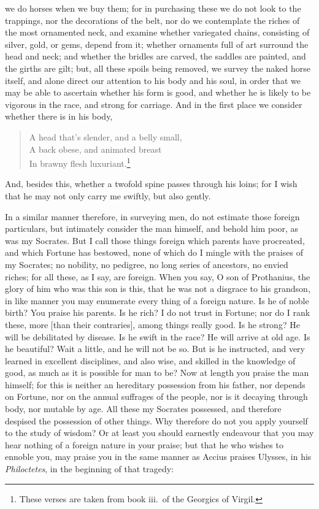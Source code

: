 \documentclass[12pt]{article}
\begin{document}
we do horses when we buy them; for in purchasing these we do not look to the
trappings, nor the decorations of the belt, nor do we contemplate the riches of
the most ornamented neck, and examine whether variegated chains, consisting of
silver, gold, or gems, depend from it; whether ornaments full of art surround
the head and neck; and whether the bridles are carved, the saddles are painted,
and the girths are gilt; but, all these spoils being removed, we survey the
naked horse itself, and alone direct our attention to his body and his soul, in
order that we may be able to ascertain whether his form is good, and whether he
is likely to be vigorous in the race, and strong for carriage. And in the first
place we consider whether there is in his body,

\begin{verse}
A head that's slender, and a belly small,\\
A back obese, and animated breast\\
In brawny flesh luxuriant.\footnote{These verses are taken from book iii.~of
the Georgics of Virgil.}
\end{verse}

\noindent And, besides this, whether a twofold spine passes through his loins;
for I wish that he may not only carry me swiftly, but also gently.

In a similar manner therefore, in surveying men, do not estimate those foreign
particulars, but intimately consider the man himself, and behold him poor, as
was my Socrates. But I call those things foreign which parents have procreated,
and which Fortune has bestowed, none of which do I mingle with the praises of
my Socrates; no nobility, no pedigree, no long series of ancestors, no envied
riches; for all these, as I say, are foreign. When you say, O son of
Prothanius, the glory of him who was this son is this, that he was not a
disgrace to his grandson, in like manner you may enumerate every thing of a
foreign nature. Is he of noble birth? You praise his parents. Is he rich? I do
not trust in Fortune; nor do I rank these, more [than their contraries], among
things really good. Is he strong? He will be debilitated by disease. Is he
swift in the race? He will arrive at old age. Is he beautiful? Wait a little,
and he will not be so. But is he instructed, and very learned in excellent
disciplines, and also wise, and skilled in the knowledge of good, as much as it
is possible for man to be? Now at length you praise the man himself; for this
is neither an hereditary possession from his father, nor depends on Fortune,
nor on the annual suffrages of the people, nor is it decaying through body, nor
mutable by age. All these my Socrates possessed, and therefore despised the
possession of other things. Why therefore do not you apply yourself to the
study of wisdom? Or at least you should earnestly endeavour that you may hear
nothing of a foreign nature in your praise; but that he who wishes to ennoble
you, may praise you in the same manner as Accius praises Ulysses, in his
\textit{Philoctetes}, in the beginning of that tragedy:
\end{document}
